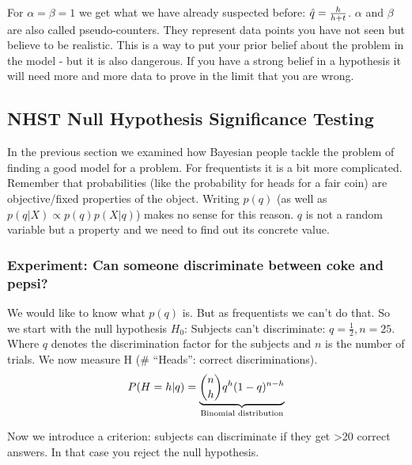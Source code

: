 \documentclass[../main/Notes.tex]{subfiles}
\begin{document}

For $\alpha = \beta = 1$ we get what we have already suspected before: $\est{q}=\frac{h}{h+t}$. $\alpha$ and $\beta$ are also called pseudo-counters. They represent data points you have not seen but believe to be realistic. This is a way to put your prior belief about the problem in the model - but it is also dangerous. If you have a strong belief in a hypothesis it will need more and more data to prove in the limit that you are wrong.



\subsection[Null Hypothesis Significance Testing (NHST)]{NHST Null Hypothesis Significance Testing}
In the previous section we examined how Bayesian people tackle the problem of finding a good model for a problem. For frequentists it is a bit more complicated. Remember that probabilities (like the probability for heads for a fair coin) are objective/fixed properties of the object. Writing $p(q)$ (as well as $p(q|X) \propto p(q)p(X|q)$) makes no sense for this reason. $q$ is not a random variable but a property and we need to find out its concrete value.

\subsubsection*{Experiment: Can someone discriminate between coke and pepsi?}
We would like to know what $p(q)$ is. But as frequentists we can't do that. So we start with the null hypothesis $H_0$: Subjects can't discriminate: $q = \frac{1}{2}, n = 25$. Where $q$ denotes the discrimination factor for the subjects and $n$ is the number of trials. We now measure H (\# ``Heads'': correct discriminations).
\begin{align*}
P(H=h|q) = \underbrace{ \binom{n}{h} q^h (1-q)^{n-h} }_\text{Binomial distribution}\index{Binomial Distribution}
\end{align*}

Now we introduce a criterion: subjects can discriminate if they get >20 correct answers. In that case you reject the null hypothesis.
\end{document}
